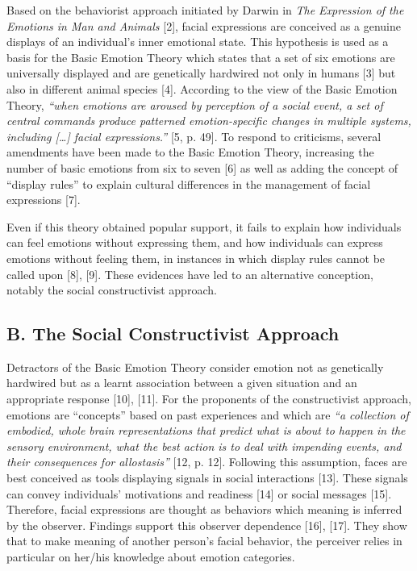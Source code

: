\documentclass[conference,final,]{IEEEtran}
\begin{document}
Based on the behaviorist approach initiated by Darwin in \emph{The
Expression of the Emotions in Man and Animals} {[}2{]}, facial
expressions are conceived as a genuine displays of an individual's inner
emotional state. This hypothesis is used as a basis for the Basic
Emotion Theory which states that a set of six emotions are universally
displayed and are genetically hardwired not only in humans {[}3{]} but
also in different animal species {[}4{]}. According to the view of the
Basic Emotion Theory, \emph{``when emotions are aroused by perception of
a social event, a set of central commands produce patterned
emotion-specific changes in multiple systems, including {[}\ldots{}{]}
facial expressions.''} {[}5, p. 49{]}. To respond to criticisms, several
amendments have been made to the Basic Emotion Theory, increasing the
number of basic emotions from six to seven {[}6{]} as well as adding the
concept of ``display rules'' to explain cultural differences in the
management of facial expressions {[}7{]}.

Even if this theory obtained popular support, it fails to explain how
individuals can feel emotions without expressing them, and how
individuals can express emotions without feeling them, in instances in
which display rules cannot be called upon {[}8{]}, {[}9{]}. These
evidences have led to an alternative conception, notably the social
constructivist approach.

\hypertarget{b.-the-social-constructivist-approach}{%
\subsection{B. The Social Constructivist
Approach}\label{b.-the-social-constructivist-approach}}

Detractors of the Basic Emotion Theory consider emotion not as
genetically hardwired but as a learnt association between a given
situation and an appropriate response {[}10{]}, {[}11{]}. For the
proponents of the constructivist approach, emotions are ``concepts''
based on past experiences and which are \emph{``a collection of
embodied, whole brain representations that predict what is about to
happen in the sensory environment, what the best action is to deal with
impending events, and their consequences for allostasis''} {[}12, p.
12{]}. Following this assumption, faces are best conceived as tools
displaying signals in social interactions {[}13{]}. These signals can
convey individuals' motivations and readiness {[}14{]} or social
messages {[}15{]}. Therefore, facial expressions are thought as
behaviors which meaning is inferred by the observer. Findings support
this observer dependence {[}16{]}, {[}17{]}. They show that to make
meaning of another person's facial behavior, the perceiver relies in
particular on her/his knowledge about emotion categories.
\end{document}
